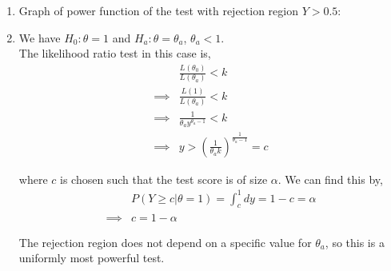 \documentclass[12pt]{article}
\newenvironment{problem}[2][Problem]{\begin{trivlist}
\item[\hskip \labelsep {\bfseries #1}\hskip \labelsep {\bfseries #2.}]}{\end{trivlist}}
\begin{document}
\begin{problem}{10.96}
\end{problem}

\begin{enumerate}[label=\alph*)]
	\item Graph of power function of the test with rejection region $Y > 0.5$:\\
	
	\item We have $H_0: \theta = 1$ and $H_a: \theta = \theta_a$, $\theta_a < 1$.\\
	
	The likelihood ratio test in this case is,
	\begin{align*}
		&\frac{L(\theta_0)}{L(\theta_a)} < k\\
		\implies &\frac{L(1)}{L(\theta_a)} < k\\
		\implies &\frac{1}{\theta_a y^{\theta_a - 1}} < k\\
		\implies &y > \left(\frac{1}{\theta_a k}\right)^{\frac{1}{\theta_a - 1}} = c
	\end{align*}
	
	where $c$ is chosen such that the test score is of size $\alpha$. We can find this by,
	\begin{align*}
		&P(Y \geq c | \theta = 1) = \int_c^1 dy = 1 - c = \alpha\\
		\implies &c = 1 - \alpha
	\end{align*}
	
	The rejection region does not depend on a specific value for $\theta_a$, so this is a uniformly most powerful test.
\end{enumerate}

\begin{problem}{10.98}
\end{problem}
\end{document}

